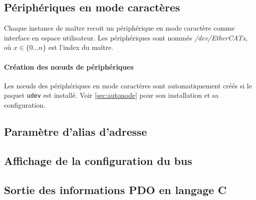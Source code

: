 \documentclass[a4paper,12pt,BCOR6mm,bibtotoc,idxtotoc]{scrbook}
\begin{document}
\subsection{P\'eriph\'eriques en mode caract\`eres}
\label{sec:cdev}

Chaque instance de ma\^itre recoit un p\'eriph\'erique en mode
caract\`ere comme interface en espace utilisateur.
Les p\'eriph\'eriques sont nomm\'es \textit{/dev/EtherCATx},
o\`u $x \in \{0 \ldots n\}$ est l'index du ma\^itre.


\paragraph{Cr\'eation des n\oe{}uds de p\'eriph\'eriques}
Les n\oe{}uds des p\'eriph\'eriques en mode caract\`eres sont
automatiquement cr\'e\'es si le paquet \lstinline+udev+ est
install\'e. Voir \autoref{sec:autonode} pour son installation et sa
configuration.


\subsection{Param\`etre d'alias d'adresse}
\label{sec:ethercat-alias}




\subsection{Affichage de la configuration du bus}
\label{sec:ethercat-config}




\subsection{Sortie des informations PDO en langage C}
\label{sec:ethercat-cstruct}



\end{document}

